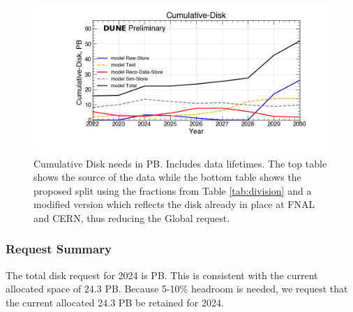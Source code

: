 \documentclass[12pt]{article}
\begin{document}
\begin{figure}[h]
\centering\includegraphics[height=0.5\textwidth]{NearTerm_2024-02-05-2030_noMWC/NearTerm_2024-02-05-2030_noMWC-Cumulative-Disk.png}
\caption{Cumulative Disk needs in PB. Includes data lifetimes.  The top table shows the source of the data while the bottom table  shows the proposed split using the fractions from Table \ref{tab:division} and a modified version which reflects the disk already in place at FNAL and CERN, thus reducing the Global request. }\label{fig:Cumulative-Disk}
\end{figure}





\subsubsection{Request Summary}\label{sec:diskresult}
The total disk request for 2024 is \DISKTotal PB.  This is consistent with the current allocated space of 24.3 PB. Because 5-10\% headroom is needed, we request that the current allocated  24.3 PB be retained for 2024. 

\clearpage
\end{document}
